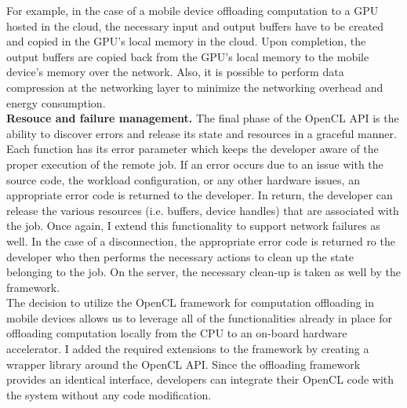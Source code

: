 %
For example, in the case of a mobile device offloading computation to a
GPU hosted in the cloud, the necessary input and output buffers have to
be created and copied in the GPU's local memory in the cloud.
%
Upon completion, the output buffers are copied back from the GPU's local
memory to the mobile device's memory over the network.
%
Also, it is possible to perform data compression at the networking layer
to minimize the networking overhead and energy consumption.\\
%
{\bf Resouce and failure management.} The final phase of the OpenCL API
is the ability to discover errors and release its state and resources in
a graceful manner.
%
Each function has its error parameter which keeps the developer aware of
the proper execution of the remote job.
%
If an error occurs due to an issue with the source code, the workload
configuration, or any other hardware issues, an appropriate error code
is returned to the developer.
%
In return, the developer can release the various resources (i.e. buffers,
device handles) that are associated with the job.
%
Once again, I extend this functionality to support network failures as
well.
%
In the case of a disconnection, the appropriate error code is returned
ro the developer who then performs the necessary actions to clean up the
state belonging to the job.
%
On the server, the necessary clean-up is taken as well by the
framework.\\
%
The decision to utilize the OpenCL framework for computation offloading
in mobile devices allows us to leverage all of the functionalities
already in place for offloading computation locally from the CPU to an
on-board hardware accelerator.
%
I added the required extensions to the framework by creating a wrapper
library around the OpenCL API.
%
Since the offloading framework provides an identical interface,
developers can integrate their OpenCL code with the system without any
code modification. 
%
